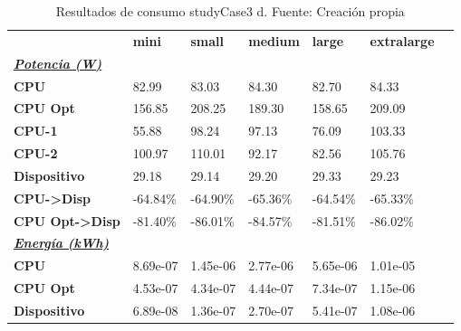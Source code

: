 \begin{table}[H]
    \centering
    \begin{tabular}{lllllll}
    \rowcolor[HTML]{DAE8FC} \ & \textbf{mini} & \textbf{small} & \textbf{medium} & \textbf{	large} & \textbf{	extralarge} \\
    \cellcolor[HTML]{DAE8FC} \textbf{\textbf{{\emph{{\underline{{Potencia (W)}}}}}}} &  &  &  & 	 & 	 \\
    \rowcolor[HTML]{EFEFEF} \cellcolor[HTML]{DAE8FC} \textbf{CPU} & 82.99 & 83.03 & 84.30 & 	82.70 & 	84.33 \\
    \cellcolor[HTML]{DAE8FC} \textbf{CPU Opt} & 156.85 & 208.25 & 189.30 & 	158.65 & 	209.09 \\
    \rowcolor[HTML]{EFEFEF} \cellcolor[HTML]{DAE8FC} \textbf{\quad CPU-1} & 55.88 & 98.24 & 97.13 & 	76.09 & 	103.33 \\
    \cellcolor[HTML]{DAE8FC} \textbf{\quad CPU-2} & 100.97 & 110.01 & 92.17 & 	82.56 & 	105.76 \\
    \rowcolor[HTML]{EFEFEF} \cellcolor[HTML]{DAE8FC} \textbf{Dispositivo} & 29.18 & 29.14 & 29.20 & 	29.33 & 	29.23 \\
    \cellcolor[HTML]{DAE8FC} \textbf{CPU->Disp} & -64.84\% & -64.90\% & -65.36\% & 	-64.54\% & 	-65.33\% \\
    \rowcolor[HTML]{EFEFEF} \cellcolor[HTML]{DAE8FC} \textbf{CPU Opt->Disp} & -81.40\% & -86.01\% & -84.57\% & 	-81.51\% & 	-86.02\% \\
    \cellcolor[HTML]{DAE8FC} \textbf{\textbf{{\emph{{\underline{{Energía (kWh)}}}}}}} &  &  &  & 	 & 	 \\
    \rowcolor[HTML]{EFEFEF} \cellcolor[HTML]{DAE8FC} \textbf{CPU} & 8.69e-07 & 1.45e-06 & 2.77e-06 & 	5.65e-06 & 	1.01e-05 \\
    \cellcolor[HTML]{DAE8FC} \textbf{CPU Opt} & 4.53e-07 & 4.34e-07 & 4.44e-07 & 	7.34e-07 & 	1.15e-06 \\
    \rowcolor[HTML]{EFEFEF} \cellcolor[HTML]{DAE8FC} \textbf{Dispositivo} & 6.89e-08 & 1.36e-07 & 2.70e-07 & 	5.41e-07 & 	1.08e-06 \\
    \end{tabular}
    \caption[Resultados de consumo studyCase3 d]{{Resultados de consumo studyCase3 d. Fuente: Creación propia}}
    \label{table_test_studyCase3_d_hw_powerResults}
\end{table}
